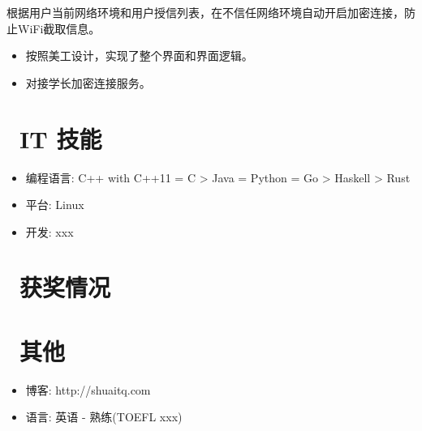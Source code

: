 \documentclass{resume}
\begin{document}
根据用户当前网络环境和用户授信列表，在不信任网络环境自动开启加密连接，防止WiFi截取信息。
\begin{itemize}
  \item 按照美工设计，实现了整个界面和界面逻辑。
  \item 对接学长加密连接服务。
\end{itemize}


\section{\faCogs\ IT 技能}
\begin{itemize}[parsep=0.5ex]
  \item 编程语言: C++ with C++11 = C > Java = Python = Go > Haskell > Rust
  \item 平台: Linux
  \item 开发: xxx
\end{itemize}

\section{\faHeartO\ 获奖情况}

\section{\faInfo\ 其他}
\begin{itemize}[parsep=0.5ex]
  \item 博客: {http://shuaitq.com}
  \item 语言: 英语 - 熟练(TOEFL xxx)
\end{itemize}

%
%
\end{document}
